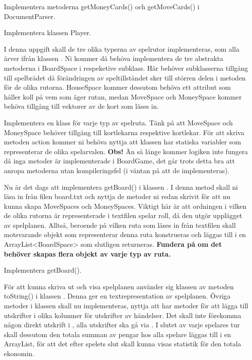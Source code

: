 \Subtask Implementera metoderna getMoneyCards() och getMoveCards() i DocumentParser.

\Subtask Implementera klassen Player.

\Task I denna uppgift skall de tre olika typerna av spelrutor implementeras, som alla ärver ifrån klassen . Ni kommer då behöva implementera de tre abstrakta metoderna i BoardSpace i respeketive subklass. Här behöver subklasserna tillgång till spelbrädet då förändringen av speltillståndet sker till störren delen i metoden  för de olika rutorna. HouseSpace kommer dessutom behöva ett attribut som håller koll på vem som äger rutan, medan MoveSpace och MoneySpace kommer behöva tillgång till vektorer av de kort som läses in.

\Subtask Implementera en klass för varje typ av spelruta. Tänk på att MoveSpace och MoneySpace behöver tillgång till kortlekarna respektive kortlekar.
För att skriva metoden action kommer ni behöva nyttja att klassen  har statiska variabler som representerar de olika spelarvalen.
\newline
\newline
\noindent
\textbf{Obs!} Än så länge kommer logiken inte fungera då inga metoder är implementerade i BoardGame, det går trots detta bra att anropa metoderna utan kompileringsfel (i väntan på att de implementeras).



\Task Nu är det dags att implementera getBoard() i klassen . I denna metod skall ni läsa in från filen board.txt och nyttja de metoder ni redan skrivit för att nu kunna skapa MoveSpaces och MoneySpaces. Viktigt här är att ordningen i vilken de olika rutorna är representerade i textfilen spelar roll, då den utgör upplägget av spelplanen. Alltså, beroende på vilken ruta som läses in från textfilen skall motsvarande objekt som representerar denna ruta konstrueras och läggas till i en ArrayList<BoardSpace> som slutligen returneras.
\textbf{Fundera på om det behöver skapas flera objekt av varje typ av ruta.} 

\Subtask Implementera getBoard().

\Task För att kunna skriva ut och visa spelplanen använder sig klassen   av metoden toString() i klassen . Denna ger en textrepresentation av spelplanen. Övriga metoder i klassen  skall nu implementeras, nyttja att   har metoder för att lägga till utskrifter i olika kolumner för utskrifter av händelser. Det skall inte förekomma någon direkt utskrift i  , alla utskrifter ska gå via . I slutet av varje spelares tur skall dessutom den totala summan av pengar hos alla spelare läggas till i en ArrayList, för att det efter spelets slut skall kunna visas statistik för den totala ekonomin.

